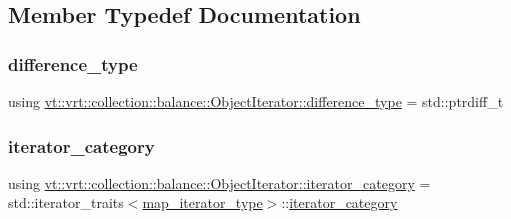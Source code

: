 \subsection{Member Typedef Documentation}
\mbox{\label{classvt_1_1vrt_1_1collection_1_1balance_1_1_object_iterator_a97e592ab92b9cdf3156c10aacad7723c}} 
\subsubsection{\texorpdfstring{difference\+\_\+type}{difference\_type}}
{\footnotesize\ttfamily using \hyperlink{classvt_1_1vrt_1_1collection_1_1balance_1_1_object_iterator_a97e592ab92b9cdf3156c10aacad7723c}{vt\+::vrt\+::collection\+::balance\+::\+Object\+Iterator\+::difference\+\_\+type} =  std\+::ptrdiff\+\_\+t\hspace{0.3cm}{\ttfamily [private]}}

\mbox{\label{classvt_1_1vrt_1_1collection_1_1balance_1_1_object_iterator_a8dd3383cf328b85a95a77501a34b252d}} 
\subsubsection{\texorpdfstring{iterator\+\_\+category}{iterator\_category}}
{\footnotesize\ttfamily using \hyperlink{classvt_1_1vrt_1_1collection_1_1balance_1_1_object_iterator_a8dd3383cf328b85a95a77501a34b252d}{vt\+::vrt\+::collection\+::balance\+::\+Object\+Iterator\+::iterator\+\_\+category} =  std\+::iterator\+\_\+traits$<$\hyperlink{classvt_1_1vrt_1_1collection_1_1balance_1_1_object_iterator_a9100746b4842b68f94f569a9e8e2cda0}{map\+\_\+iterator\+\_\+type}$>$\+::\hyperlink{classvt_1_1vrt_1_1collection_1_1balance_1_1_object_iterator_a8dd3383cf328b85a95a77501a34b252d}{iterator\+\_\+category}\hspace{0.3cm}{\ttfamily [private]}}

